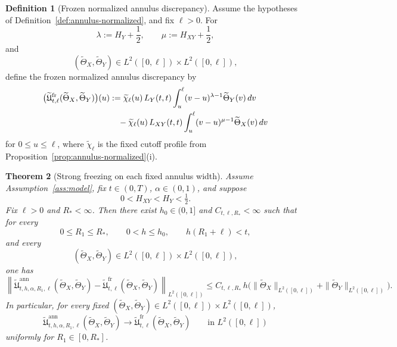 \documentclass[11pt,a4paper]{amsart}
\theoremstyle{plain}
\newtheorem{theorem}{Theorem}[section]
\theoremstyle{definition}
\newtheorem{definition}[theorem]{Definition}
\theoremstyle{remark}
\begin{document}
\begin{definition}[Frozen normalized annulus discrepancy]
\label{def:annulus-frozen}
Assume the hypotheses of Definition~\ref{def:annulus-normalized}, and fix \(\ell>0\). For
\[
\lambda:=H_Y+\frac12,
\qquad
\mu:=H_{XY}+\frac12,
\]
and
\[
(\widetilde\Theta_X,\widetilde\Theta_Y)\in L^2([0,\ell])\times L^2([0,\ell]),
\]
define the frozen normalized annulus discrepancy by
\begin{align}
\bigl(
\widetilde{\mathfrak U}_{t,\ell}^{\mathrm{fr}}
(\widetilde\Theta_X,\widetilde\Theta_Y)
\bigr)(u)
&:=
\widetilde\chi_\ell(u)\,L_Y(t,t)
\int_u^\ell
(v-u)^{\lambda-1}\widetilde\Theta_Y(v)\,dv
\notag\\
&\quad-
\widetilde\chi_\ell(u)\,L_{XY}(t,t)
\int_u^\ell
(v-u)^{\mu-1}\widetilde\Theta_X(v)\,dv
\label{eq:annulus-frozen}
\end{align}
for \(0\le u\le \ell\), where \(\widetilde\chi_\ell\) is the fixed cutoff profile from
Proposition~\ref{prop:annulus-normalized}(i).
\end{definition}

\begin{theorem}[Strong freezing on each fixed annulus width]
\label{thm:annulus-frozen}
Assume Assumption~\ref{ass:model}, fix \(t\in(0,T)\), \(\alpha\in(0,1)\), and suppose
\[
0<H_{XY}<H_Y<\tfrac12.
\]
Fix \(\ell>0\) and \(R_*<\infty\). Then there exist \(h_0\in(0,1]\) and \(C_{t,\ell,R_*}<\infty\)
such that for every
\[
0\le R_1\le R_*,
\qquad
0<h\le h_0,
\qquad
h(R_1+\ell)<t,
\]
and every
\[
(\widetilde\Theta_X,\widetilde\Theta_Y)\in L^2([0,\ell])\times L^2([0,\ell]),
\]
one has
\begin{equation}\label{eq:annulus-frozen-bound}
\left\|
\widetilde{\mathfrak U}_{t,h,\alpha,R_1,\ell}^{\mathrm{ann}}
(\widetilde\Theta_X,\widetilde\Theta_Y)
-
\widetilde{\mathfrak U}_{t,\ell}^{\mathrm{fr}}
(\widetilde\Theta_X,\widetilde\Theta_Y)
\right\|_{L^2([0,\ell])}
\le
C_{t,\ell,R_*}\,h
\bigl(
\|\widetilde\Theta_X\|_{L^2([0,\ell])}
+
\|\widetilde\Theta_Y\|_{L^2([0,\ell])}
\bigr).
\end{equation}
In particular, for every fixed \((\widetilde\Theta_X,\widetilde\Theta_Y)\in
L^2([0,\ell])\times L^2([0,\ell])\),
\begin{equation}\label{eq:annulus-frozen-conv}
\widetilde{\mathfrak U}_{t,h,\alpha,R_1,\ell}^{\mathrm{ann}}
(\widetilde\Theta_X,\widetilde\Theta_Y)
\longrightarrow
\widetilde{\mathfrak U}_{t,\ell}^{\mathrm{fr}}
(\widetilde\Theta_X,\widetilde\Theta_Y)
\qquad\text{in }L^2([0,\ell])
\end{equation}
uniformly for \(R_1\in[0,R_*]\).
\end{theorem}
\end{document}
